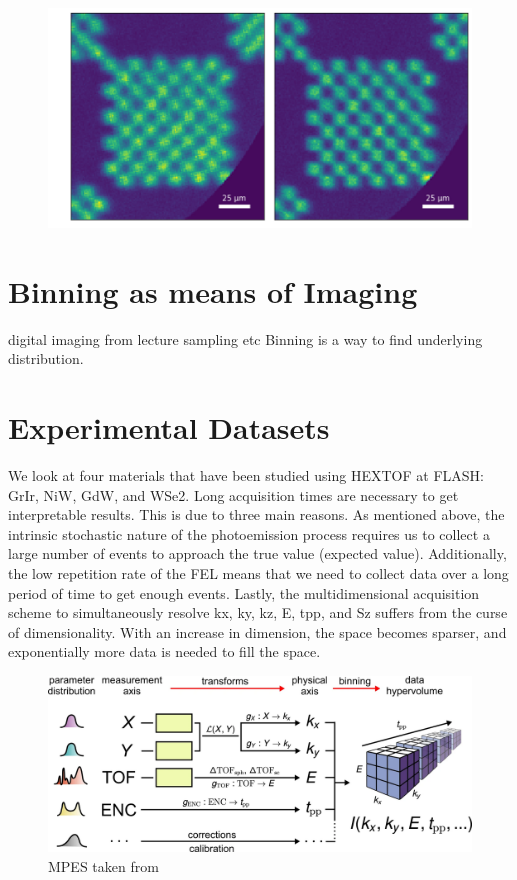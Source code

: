 \begin{figure}
    \includegraphics[width=1\linewidth]{images/chessy_deblurring_merged_events.png}
\end{figure}

\section{Binning as means of Imaging}
digital imaging from lecture
sampling etc
Binning is a way to find underlying distribution.

\section{Experimental Datasets}\label{section:datasets}
We look at four materials that have been studied using \gls{HEXTOF} at \gls{FLASH}: \gls{GrIr}, \gls{NiW}, \gls{GdW}, and \gls{WSe2}. Long acquisition times are necessary to get interpretable results. This is due to three main reasons. As mentioned above, the intrinsic stochastic nature of the photoemission process requires us to collect a large number of events to approach the true value (expected value). Additionally, the low repetition rate of the \gls{FEL} means that we need to collect data over a long period of time to get enough events. Lastly, the multidimensional acquisition scheme to simultaneously resolve \gls{kx}, \gls{ky}, \gls{kz}, \gls{E}, \gls{tpp}, and \gls{Sz} suffers from the curse of dimensionality. With an increase in dimension, the space becomes sparser, and exponentially more data is needed to fill the space.

\begin{figure}
    \centering
    \includegraphics[width=1\linewidth]{images/2024-08-25-22-36-44.png}
    \caption{MPES taken from \cite{xianOpensourceEndtoendWorkflow2020}}
    \label{fig:mpes workflow}
\end{figure}

